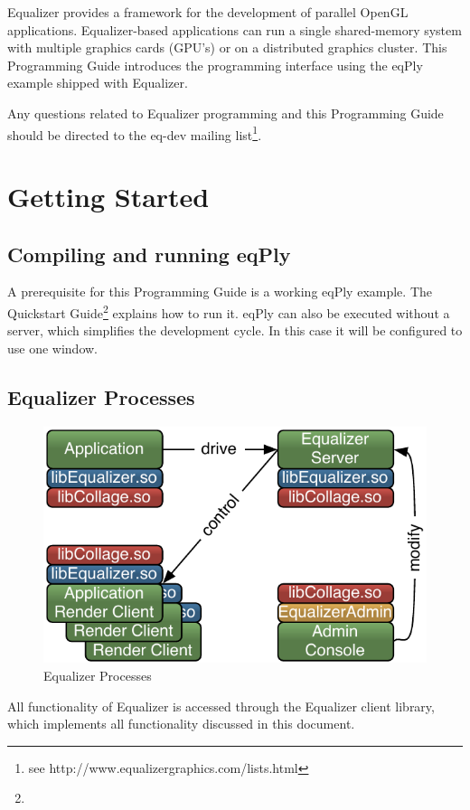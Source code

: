 \documentclass[10pt,a4]{scrartcl}
\begin{document}
Equalizer provides a framework for the development of parallel OpenGL
applications. Equalizer-based applications can run a single
shared-memory system with multiple graphics cards (GPU's) or on a
distributed graphics cluster. This Programming Guide introduces the
programming interface using the \textsf{eqPly} example shipped with Equalizer.

Any questions related to Equalizer programming and this Programming
Guide should be directed to the \textsf{eq-dev} mailing
list\footnote{see
  {http://www.equalizergraphics.com/lists.html}}.



\section{Getting Started}


\subsection{Compiling and running \textsf{eqPly}}

A prerequisite for this Programming Guide is a working \textsf{eqPly}
example. The Quickstart
Guide\footnote{}
explains how to run it. \textsf{eqPly} can also be executed without a
server, which simplifies the development cycle. In this case it will be
configured to use one window.


\subsection{Equalizer Processes}

\begin{figure}
  \includegraphics[width=.4\textwidth]{images/processes.pdf}
  {\caption{\small\label{fProcesses}Equalizer Processes}}
\end{figure}
All functionality of Equalizer is accessed through the Equalizer client
library, which implements all functionality discussed in this document.
\end{document}
